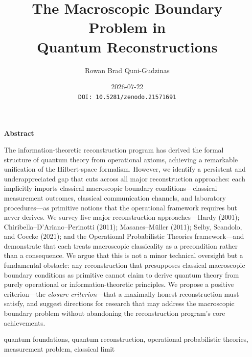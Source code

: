 \documentclass[12pt,a4paper,twoside]{article}
\begin{document}
\title{The Macroscopic Boundary Problem in\\Quantum Reconstructions}

\author{Rowan Brad Quni-Gudzinas}

\date{2026-07-22\\[0.3em]\small\texttt{DOI: 10.5281/zenodo.21571691}}

\maketitle

\begin{center}
{\large\bfseries Abstract}
\end{center}
\vspace{-0.5em}
\noindent
The information-theoretic reconstruction program has derived the formal structure of quantum theory from operational axioms, achieving a remarkable unification of the Hilbert-space formalism. However, we identify a persistent and underappreciated gap that cuts across all major reconstruction approaches: each implicitly imports classical macroscopic boundary conditions---classical measurement outcomes, classical communication channels, and laboratory procedures---as primitive notions that the operational framework requires but never derives. We survey five major reconstruction approaches---Hardy (2001); Chiribella--D'Ariano--Perinotti (2011); Masanes--M\"{u}ller (2011); Selby, Scandolo, and Coecke (2021); and the Operational Probabilistic Theories framework---and demonstrate that each treats macroscopic classicality as a precondition rather than a consequence. We argue that this is not a minor technical oversight but a fundamental obstacle: any reconstruction that presupposes classical macroscopic boundary conditions as primitive cannot claim to derive quantum theory from purely operational or information-theoretic principles. We propose a positive criterion---the \emph{closure criterion}---that a maximally honest reconstruction must satisfy, and suggest directions for research that may address the macroscopic boundary problem without abandoning the reconstruction program's core achievements.

\vspace{1em}
 quantum foundations, quantum reconstruction, operational probabilistic theories, measurement problem, classical limit

\newpage

\end{document}
